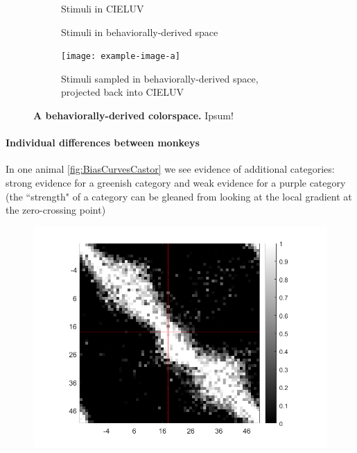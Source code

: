 \begin{figure}
    \centering
    \begin{subfigure}[b]{0.3\textwidth}
         \centering
         \caption{Stimuli in CIELUV \newline\newline}
         
         \label{fig:CIELUV}
    \end{subfigure}
    \hfill
    \begin{subfigure}[b]{0.3\textwidth}
         \centering
         \caption{Stimuli in behaviorally-derived space \newline}
         
         \label{fig:MACBEHspace}
    \end{subfigure}
    \hfill
    \begin{subfigure}[b]{0.3\textwidth}
         \centering
         \caption{Stimuli sampled in behaviorally-derived space, projected back into CIELUV}
         \texttt{[image: example-image-a]}
         \label{fig:UniformStimsInCIELUV}
    \end{subfigure}
           \caption{\textbf{A behaviorally-derived colorspace.} Ipsum!}
        \label{fig:MACBEHcolorspace}
    
\end{figure}

\paragraph{Individual differences between monkeys}

In one animal \autoref{fig:BiasCurvesCastor} we see evidence of additional categories: strong evidence for a greenish category and weak evidence for a purple category (the ``strength" of a category can be gleaned from looking at the local gradient at the zero-crossing point)

\begin{figure}
\includegraphics[width=\linewidth]{../Figures/working/6_IndiDataCogBias/Castor_18.png}
\caption{\textbf{} 
}
\label{fig:IndiDataCogBias}
\end{figure}